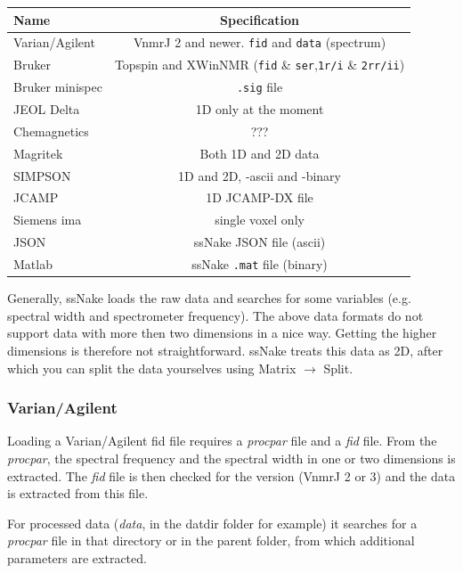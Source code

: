 \documentclass[11pt,a4paper]{article}
\begin{document}
\begin{center}
\begin{tabular}{lc}
\toprule
Name & Specification \\
\midrule
\rowcolor{gray!30!white}
Varian/Agilent & VnmrJ 2 and newer. \texttt{fid} and \texttt{data} (spectrum)\\
Bruker & Topspin and XWinNMR (\texttt{fid} \& \texttt{ser},\texttt{1r/i} \& \texttt{2rr/ii}) \\
\rowcolor{gray!30!white}
Bruker minispec  & \texttt{.sig} file\\
JEOL Delta & 1D only at the moment \\
\rowcolor{gray!30!white}
Chemagnetics & ??? \\
Magritek & Both 1D and 2D data \\
\rowcolor{gray!30!white}
SIMPSON & 1D and 2D, -ascii and -binary \\
JCAMP & 1D JCAMP-DX file\\
\rowcolor{gray!30!white}
Siemens ima & single voxel only\\
JSON & ssNake JSON file (ascii)\\
\rowcolor{gray!30!white}
Matlab & ssNake \texttt{.mat} file (binary)\\
\bottomrule
\end{tabular}
\end{center}

Generally, ssNake loads the raw data and searches for some variables (e.g. spectral width and spectrometer frequency). The above data formats do not support data with more then two dimensions in a nice way. Getting the higher dimensions is therefore not straightforward. ssNake treats this data as 2D, after which you can split the data yourselves using Matrix $\rightarrow$ Split.

\subsubsection*{Varian/Agilent}
Loading a Varian/Agilent fid file requires a \textit{procpar} file and a \textit{fid} file. From the \textit{procpar}, the spectral frequency and the spectral width in one or two dimensions is extracted. The \textit{fid} file is then checked for the version (VnmrJ 2 or 3) and the data is extracted from this file.

For processed data (\textit{data}, in the datdir folder for example) it searches for a \textit{procpar} file in that directory or in the parent folder, from which additional parameters are extracted.
\end{document}
